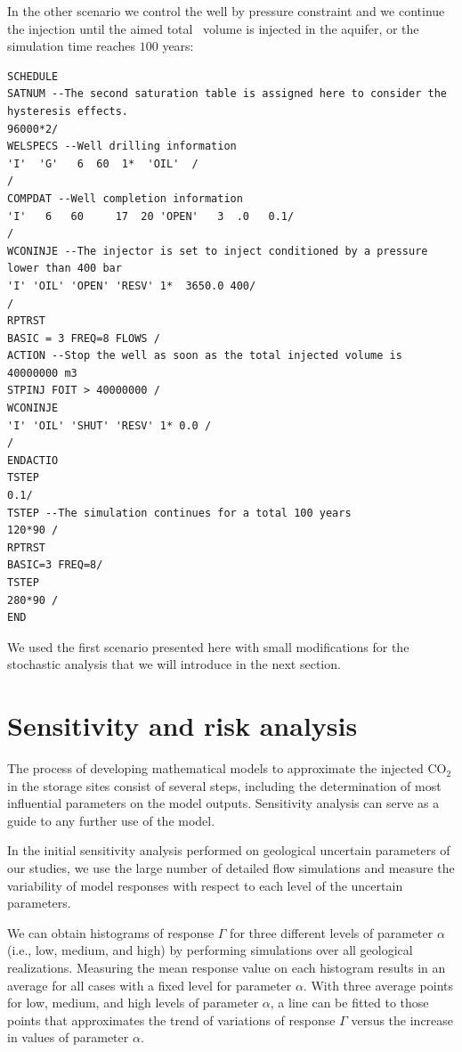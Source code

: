 In the other scenario we control the well by pressure constraint and we continue the injection until the aimed total \coo\ volume is injected in the aquifer, or the simulation time reaches $100$ years:
\begin{lstlisting}
SCHEDULE
SATNUM --The second saturation table is assigned here to consider the hysteresis effects.
96000*2/  
WELSPECS --Well drilling information
'I'  'G'   6  60  1*  'OIL'  /
/
COMPDAT --Well completion information
'I'   6   60     17  20 'OPEN'   3  .0   0.1/
/
WCONINJE --The injector is set to inject conditioned by a pressure lower than 400 bar
'I' 'OIL' 'OPEN' 'RESV' 1*  3650.0 400/
/
RPTRST
BASIC = 3 FREQ=8 FLOWS /
ACTION --Stop the well as soon as the total injected volume is 40000000 m3
STPINJ FOIT > 40000000 /
WCONINJE
'I' 'OIL' 'SHUT' 'RESV' 1* 0.0 /
/
ENDACTIO
TSTEP
0.1/
TSTEP --The simulation continues for a total 100 years
120*90 /
RPTRST
BASIC=3 FREQ=8/
TSTEP
280*90 /
END
\end{lstlisting}
We used the first scenario presented here with small modifications for the stochastic analysis that we will introduce in the next section.

\section{Sensitivity and risk analysis}
\label{sec:StochasticAnalysis}

The process of developing mathematical models to approximate the injected $\mbox{CO}_{2}$ in the
storage sites consist of several steps, including the determination of
most influential parameters on the model outputs. Sensitivity
analysis can serve as a guide to any further use of the model.

In the initial sensitivity analysis performed on geological uncertain
parameters of our studies, we use the large number of detailed flow
simulations and measure the variability of model responses with respect to each
level of the uncertain parameters.

We can obtain histograms of response $\Gamma$  for three different levels of
parameter $\alpha$ (i.e., low, medium, and high) by performing simulations over
all geological realizations. Measuring the mean response value on
each histogram results in an average for all cases with a fixed level for
parameter $\alpha$. With three average points for low, medium,
and high levels of parameter $\alpha$, a line can be fitted to those points 
that approximates the trend of variations of response $\Gamma$ versus the
increase in values of parameter $\alpha$.

